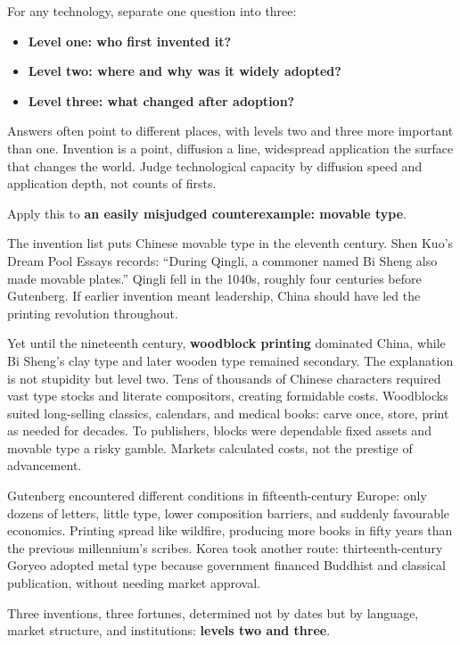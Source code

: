 For any technology, separate one question into three:

\begin{itemize}
\item \textbf{Level one: who first invented it?}
\item \textbf{Level two: where and why was it widely adopted?}
\item \textbf{Level three: what changed after adoption?}
\end{itemize}
Answers often point to different places, with levels two and three more important than one. Invention is a point, diffusion a line, widespread application the surface that changes the world. Judge technological capacity by diffusion speed and application depth, not counts of firsts.

Apply this to \textbf{an easily misjudged counterexample: movable type}.

The invention list puts Chinese movable type in the eleventh century. Shen Kuo's Dream Pool Essays records: ``During Qingli, a commoner named Bi Sheng also made movable plates.'' Qingli fell in the 1040s, roughly four centuries before Gutenberg. If earlier invention meant leadership, China should have led the printing revolution throughout.

Yet until the nineteenth century, \textbf{woodblock printing} dominated China, while Bi Sheng's clay type and later wooden type remained secondary. The explanation is not stupidity but level two. Tens of thousands of Chinese characters required vast type stocks and literate compositors, creating formidable costs. Woodblocks suited long-selling classics, calendars, and medical books: carve once, store, print as needed for decades. To publishers, blocks were dependable fixed assets and movable type a risky gamble. Markets calculated costs, not the prestige of advancement.

Gutenberg encountered different conditions in fifteenth-century Europe: only dozens of letters, little type, lower composition barriers, and suddenly favourable economics. Printing spread like wildfire, producing more books in fifty years than the previous millennium's scribes. Korea took another route: thirteenth-century Goryeo adopted metal type because government financed Buddhist and classical publication, without needing market approval.

Three inventions, three fortunes, determined not by dates but by language, market structure, and institutions: \textbf{levels two and three}.

